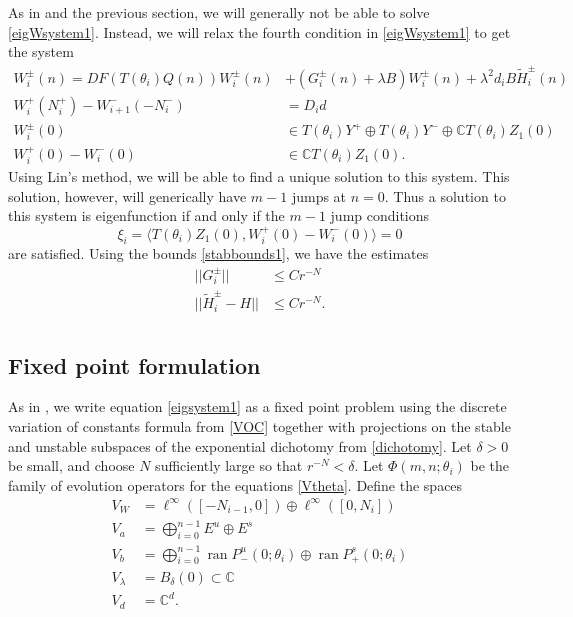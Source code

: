\documentclass[12pt]{elsarticle}
\def\C{{\mathbb C}}
\DeclareMathOperator{\ran}{ran}
\begin{document}
As in \cite{Sandstede1998} and the previous section, we will generally not be able to solve \cref{eigWsystem1}. Instead, we will relax the fourth condition in \cref{eigWsystem1} to get the system
\begin{align}
W_i^\pm(n) = DF(T(\theta_i) Q(n) ) W_i^\pm(n) &+ (G_i^\pm(n) + \lambda B) W_i^\pm(n) + \lambda^2 d_i B \tilde{H}_i^\pm(n) \label{eigsystem1} \\
W_i^+(N_i^+) - W_{i+1}^-(-N_i^-) &= D_i d \label{eigsystem2} \\
W_i^\pm(0) &\in T(\theta_i) Y^+ \oplus T(\theta_i) Y^- \oplus \C T(\theta_i) Z_1(0) \label{eigsystem3a} \\
W_i^+(0) - W_i^-(0) &\in \C T(\theta_i) Z_1(0). \label{eigsystem3b} 
\end{align}
Using Lin's method, we will be able to find a unique solution to this system. This solution, however, will generically have $m-1$ jumps at $n = 0$. Thus a solution to this system is eigenfunction if and only if the $m-1$ jump conditions
\begin{equation*}
\xi_i = \langle T(\theta_i) Z_1(0), W_i^+(0) - W_i^-(0) \rangle = 0
\end{equation*}
are satisfied. Using the bounds \cref{stabbounds1}, we have the estimates
\begin{equation}\label{stabbounds2}
\begin{aligned}
||G_i^\pm|| &\leq C r^{-N} \\
||\tilde{H}_i^\pm - H|| &\leq C r^{-N}. \\
\end{aligned}
\end{equation}

\subsection{Fixed point formulation}

As in \cite{Sandstede1998}, we write equation \cref{eigsystem1} as a fixed point problem using the discrete variation of constants formula from \cref{VOC} together with projections on the stable and unstable subspaces of the exponential dichotomy from \cref{dichotomy}. Let $\delta > 0$ be small, and choose $N$ sufficiently large so that $r^{-N} < \delta$. Let $\Phi(m, n; \theta_i)$ be the family of evolution operators for the equations \cref{Vtheta}. Define the spaces
\begin{align*}
V_W &= \ell^\infty([-N_{i-1}, 0]) \oplus \ell^\infty([0, N_i])  \\
V_a &= \bigoplus_{i=0}^{n-1} E^u \oplus E^s \\
V_b &= \bigoplus_{i=0}^{n-1} \ran P_-^u(0; \theta_i) \oplus \ran P_+^s(0; \theta_i)\\
V_\lambda &= B_\delta(0) \subset \C \\
V_d &= \C^d.
\end{align*}
\end{document}
